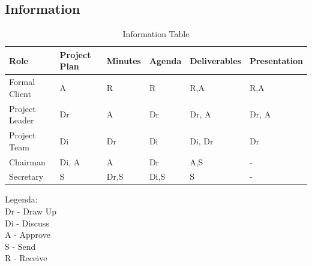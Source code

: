 \documentclass[a4paper,11pt]{article}
\begin{document}
      	\subsection{Information}
      	\begin{table}[h!]
      		\centering
      		\caption{Information Table}
      		\label{tab:table2}
      		\begin{tabularx}{\textwidth}{ |X|X|X|X|X|X|}
      			\hline
      			\textbf{Role} & \textbf{
      			Project Plan
      				}&  \textbf{
      			Minutes
      				}& \textbf{
      				Agenda
      			}& \textbf{
      		Deliverables
      		}& \textbf{
      	Presentation
      	}
      				\\
      				\hline
      			Formal Client&A&R&R&R,A&R,A
      				\\
      				\hline
      				Project Leader& Dr&A&Dr&Dr, A&Dr, A
      				\\
      				\hline
      				
      			Project Team&Di&Dr&Di&Di, Dr & Dr
      				\\ \hline
      				Chairman& Di, A &A&Dr&A,S&-
      				\\ \hline
      				Secretary& S & Dr,S &Di,S&S&-
      				\\ \hline
      				
      				\end{tabularx}
      				\end{table}
      				Legenda:\\ Dr - Draw Up\\
      				Di - Discuss \\
      				A - Approve\\
      				S - Send\\
      				R - Receive
      				
\end{document}

